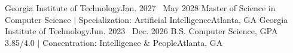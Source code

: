 \resumeSubHeadingListStart

    \resumeSubheading
  {Georgia Institute of Technology}{Jan. 2027 \textemdash\ May 2028}
  {Master of Science in Computer Science $|$ Specialization: Artificial Intelligence}{Atlanta, GA}
    \resumeSubheading
  {Georgia Institute of Technology}{Jun. 2023 \textemdash\ Dec. 2026}
  {B.S. Computer Science, GPA 3.85/4.0 $|$ Concentration: Intelligence \& People}{Atlanta, GA}
    \vspace{-8pt}

\resumeSubHeadingListEnd